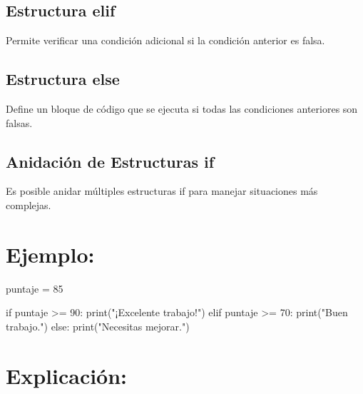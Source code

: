 \documentclass[
  a4paper,
  DIV=11,
  numbers=noendperiod,
  onepage,
  openany]{scrreprt}
\newenvironment{Shaded}{\begin{snugshade}}{\end{snugshade}}
\newcommand{\BuiltInTok}[1]{\textcolor[rgb]{0.00,0.23,0.31}{#1}}
\newcommand{\ControlFlowTok}[1]{\textcolor[rgb]{0.00,0.23,0.31}{#1}}
\newcommand{\DecValTok}[1]{\textcolor[rgb]{0.68,0.00,0.00}{#1}}
\newcommand{\NormalTok}[1]{\textcolor[rgb]{0.00,0.23,0.31}{#1}}
\newcommand{\OperatorTok}[1]{\textcolor[rgb]{0.37,0.37,0.37}{#1}}
\newcommand{\StringTok}[1]{\textcolor[rgb]{0.13,0.47,0.30}{#1}}
\begin{document}
\hypertarget{estructura-elif-1}{%
\subsection{Estructura elif}\label{estructura-elif-1}}

Permite verificar una condición adicional si la condición anterior es
falsa.

\hypertarget{estructura-else-1}{%
\subsection{Estructura else}\label{estructura-else-1}}

Define un bloque de código que se ejecuta si todas las condiciones
anteriores son falsas.

\hypertarget{anidaciuxf3n-de-estructuras-if-1}{%
\subsection{Anidación de Estructuras
if}\label{anidaciuxf3n-de-estructuras-if-1}}

Es posible anidar múltiples estructuras if para manejar situaciones más
complejas.

\hypertarget{ejemplo-31}{%
\section{Ejemplo:}\label{ejemplo-31}}

\begin{Shaded}
\begin{Highlighting}[]
\NormalTok{puntaje }\OperatorTok{=} \DecValTok{85}

\ControlFlowTok{if}\NormalTok{ puntaje }\OperatorTok{\textgreater{}=} \DecValTok{90}\NormalTok{:}
    \BuiltInTok{print}\NormalTok{(}\StringTok{"¡Excelente trabajo!"}\NormalTok{)}
\ControlFlowTok{elif}\NormalTok{ puntaje }\OperatorTok{\textgreater{}=} \DecValTok{70}\NormalTok{:}
    \BuiltInTok{print}\NormalTok{(}\StringTok{"Buen trabajo."}\NormalTok{)}
\ControlFlowTok{else}\NormalTok{:}
    \BuiltInTok{print}\NormalTok{(}\StringTok{"Necesitas mejorar."}\NormalTok{)}
\end{Highlighting}
\end{Shaded}

\hypertarget{explicaciuxf3n-31}{%
\section{Explicación:}\label{explicaciuxf3n-31}}
\end{document}
